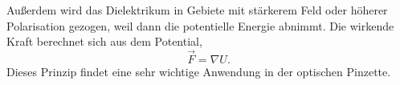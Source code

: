 Außerdem wird das Dielektrikum in Gebiete mit stärkerem Feld oder höherer Polarisation gezogen, weil dann die potentielle Energie abnimmt. Die wirkende Kraft berechnet sich aus dem Potential,
\begin{equation*}
	\vec {F}=\nabla U.
\end{equation*}
Dieses Prinzip findet eine sehr wichtige Anwendung in der optischen Pinzette.

